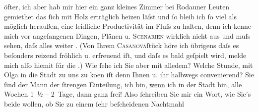 \begin{ledgroupsized}[t]{13cm}
               öfter, ich aber hab mir hier ein ganz kleines Zimmer bei Rodauner Leuten
               gemiethet das ſich mit Holz erträglich heizen läſst und ſo bleib ich ſo viel als
               möglich heraußen, eine leidliche Productivität im Fluſs zu halten, denn ich kenne
               mich vor angefangenen Dingen, Plänen u. \textsc{Scenarien} wirklich
                  {\pb}nicht aus und muſs sehen, daſs
               alles weiter \label{T_L02332_1v}\label{T_L02332_1h}. (Von Ihrem \textsc{Casanova}ſtück höre ich übrigens daſs es beſonders
               reizend fröhlich u. erfreuend iſt, und daſs es bald geſpielt wird, melde mich alſo
               hiemit für die \label{K_L02332_1v}\label{K_L02332_1h}.)\pend
           \pstart
           Wie ſehe ich Sie aber mit alledem? Welche Stunde, mit Olga in die Stadt zu uns zu ko{\geminationm}en iſt denn
               Ihnen u. ihr halbwegs convenierend?\pend
           \pstart
           Sie ſind der Mann der ſtrengen Einteilung, ich bin, \uline{wenn} ich in der Stadt bin, alle Wochen 1 ½ – 2 Tage, dann ganz
               frei! Also ſchreiben Sie mir ein Wort, wie Sie’s beide wollen, ob Sie zu einem ſehr
               beſcheidenen Nachtmahl \label{T_L02332_2v}\label{T_L02332_2h}\pend
           \endnumbering{}\end{ledgroupsized}  \newcommand{\dateiname}{L02332}\newcommand{\titel}{Hugo Hofmannsthal an Arthur Schnitzler, 8. 12. [1919]}\newcommand{\editorInnen}{Martin Anton Müller und Gerd-Hermann Susen}
            \footnotesize
\begin{ledgroupsized}[t]{11.5cm}
\end{ledgroupsized}
         
      